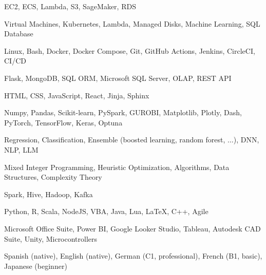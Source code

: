 

\begin{cvskills}

	{EC2, ECS, Lambda, S3, SageMaker, RDS} %

	{Virtual Machines, Kubernetes, Lambda, Managed Disks, Machine Learning, SQL Database} %

	{Linux, Bash, Docker, Docker Compose, Git, GitHub Actions, Jenkins, CircleCI, CI/CD} %

	{Flask, MongoDB, SQL ORM, Microsoft SQL Server, OLAP, REST API} %

	{HTML, CSS, JavaScript, React, Jinja, Sphinx} %

	{Numpy, Pandas, Scikit-learn, PySpark, GUROBI, Matplotlib, Plotly, Dash, PyTorch, TensorFlow, Keras, Optuna} %

	{Regression, Classification, Ensemble (boosted learning, random forest, \(\dots\)), DNN, NLP, LLM} %

	{Mixed Integer Programming, Heuristic Optimization, Algorithms, Data Structures, Complexity Theory} %

	{Spark, Hive, Hadoop, Kafka} %

	{Python, R, Scala, NodeJS, VBA, Java, Lua, LaTeX, C++, Agile} %

	{Microsoft Office Suite, Power BI, Google Looker Studio, Tableau, Autodesk CAD Suite, Unity, Microcontrollers} %

	{Spanish (native), English (native), German (C1, professional), French (B1, basic), Japanese (beginner)} %

\end{cvskills}
